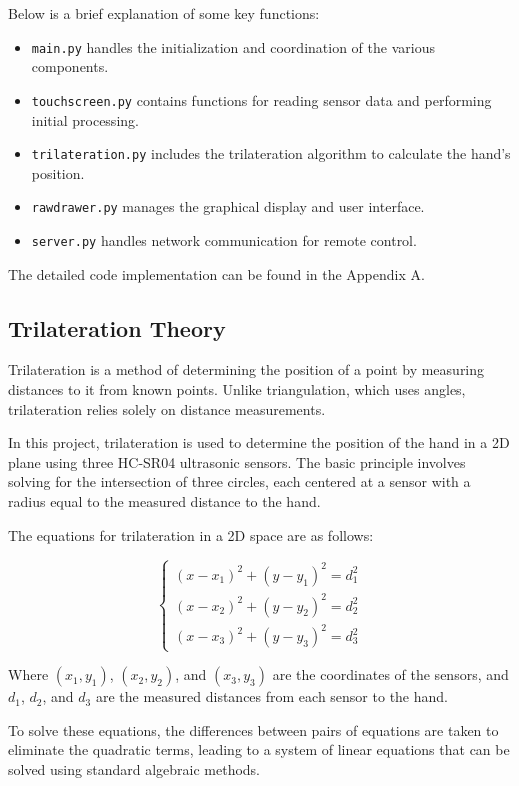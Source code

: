 \documentclass[12pt,a4paper]{article}
\begin{document}
Below is a brief explanation of some key functions:
\begin{itemize}
    \item \texttt{main.py} handles the initialization and coordination of the various components.
    \item \texttt{touchscreen.py} contains functions for reading sensor data and performing initial processing.
    \item \texttt{trilateration.py} includes the trilateration algorithm to calculate the hand's position.
    \item \texttt{rawdrawer.py} manages the graphical display and user interface.
    \item \texttt{server.py} handles network communication for remote control.
\end{itemize}

The detailed code implementation can be found in the Appendix A.

\subsection{Trilateration Theory}
Trilateration is a method of determining the position of a point by measuring distances to it from known points. Unlike triangulation, which uses angles, trilateration relies solely on distance measurements.

In this project, trilateration is used to determine the position of the hand in a 2D plane using three HC-SR04 ultrasonic sensors. The basic principle involves solving for the intersection of three circles, each centered at a sensor with a radius equal to the measured distance to the hand.

The equations for trilateration in a 2D space are as follows:

\[
\begin{cases}
(x - x_1)^2 + (y - y_1)^2 = d_1^2 \\
(x - x_2)^2 + (y - y_2)^2 = d_2^2 \\
(x - x_3)^2 + (y - y_3)^2 = d_3^2
\end{cases}
\]

Where \((x_1, y_1)\), \((x_2, y_2)\), and \((x_3, y_3)\) are the coordinates of the sensors, and \(d_1\), \(d_2\), and \(d_3\) are the measured distances from each sensor to the hand.

To solve these equations, the differences between pairs of equations are taken to eliminate the quadratic terms, leading to a system of linear equations that can be solved using standard algebraic methods.
\end{document}
